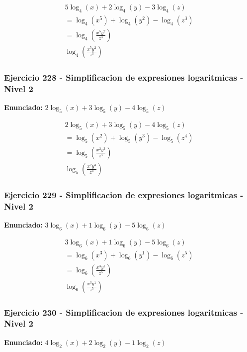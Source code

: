 \documentclass[12pt,a4paper]{article}
\begin{document}
\[
\begin{aligned}
5\log_{4}\left(x\right)+2\log_{4}\left(y\right)-3\log_{4}\left(z\right)\\
=\log_{4}\left(x^{5}\right)+\log_{4}\left(y^{2}\right)-\log_{4}\left(z^{3}\right)\\
=\log_{4}\left(\frac{x^{5}y^{2}}{z^{3}}\right)\\
\boxed{\log_{4}\left(\frac{x^{5}y^{2}}{z^{3}}\right)}
\end{aligned}
\]


\subsubsection*{Ejercicio 228 - Simplificacion de expresiones logaritmicas - Nivel 2}
\textbf{Enunciado:} \(2\log_{5}\left(x\right)+3\log_{5}\left(y\right)-4\log_{5}\left(z\right)\)

\[
\begin{aligned}
2\log_{5}\left(x\right)+3\log_{5}\left(y\right)-4\log_{5}\left(z\right)\\
=\log_{5}\left(x^{2}\right)+\log_{5}\left(y^{3}\right)-\log_{5}\left(z^{4}\right)\\
=\log_{5}\left(\frac{x^{2}y^{3}}{z^{4}}\right)\\
\boxed{\log_{5}\left(\frac{x^{2}y^{3}}{z^{4}}\right)}
\end{aligned}
\]


\subsubsection*{Ejercicio 229 - Simplificacion de expresiones logaritmicas - Nivel 2}
\textbf{Enunciado:} \(3\log_{6}\left(x\right)+1\log_{6}\left(y\right)-5\log_{6}\left(z\right)\)

\[
\begin{aligned}
3\log_{6}\left(x\right)+1\log_{6}\left(y\right)-5\log_{6}\left(z\right)\\
=\log_{6}\left(x^{3}\right)+\log_{6}\left(y^{1}\right)-\log_{6}\left(z^{5}\right)\\
=\log_{6}\left(\frac{x^{3}y^{1}}{z^{5}}\right)\\
\boxed{\log_{6}\left(\frac{x^{3}y^{1}}{z^{5}}\right)}
\end{aligned}
\]


\subsubsection*{Ejercicio 230 - Simplificacion de expresiones logaritmicas - Nivel 2}
\textbf{Enunciado:} \(4\log_{2}\left(x\right)+2\log_{2}\left(y\right)-1\log_{2}\left(z\right)\)
\end{document}
